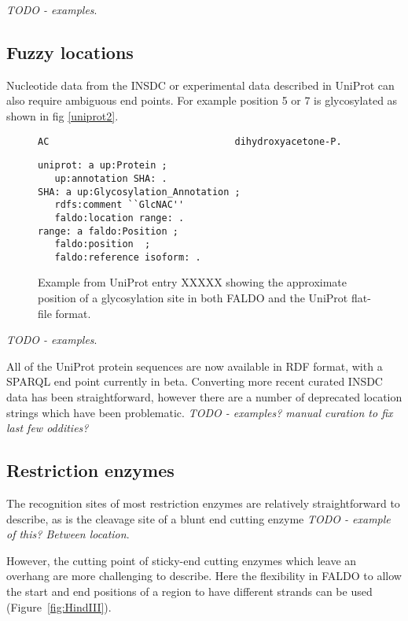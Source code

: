\textit{TODO - examples}.

\subsection*{Fuzzy locations}
Nucleotide data from the INSDC or experimental data described in UniProt 
can also require ambiguous end points. For example position 5 or 7 is glycosylated
as shown in fig \ref{uniprot2}.

\begin{figure}
\begin{verbatim}
AC                                 dihydroxyacetone-P.
\end{verbatim}
\begin{verbatim}
uniprot: a up:Protein ;
   up:annotation SHA: .
SHA: a up:Glycosylation_Annotation ;
   rdfs:comment ``GlcNAC''
   faldo:location range: .
range: a faldo:Position ;
   faldo:position  ;
   faldo:reference isoform: .
\end{verbatim}
\caption{Example from UniProt entry XXXXX showing the approximate position of a glycosylation site in both FALDO and the UniProt flat-file format.}
\label{fig:UniProt}
\end{figure}

\textit{TODO - examples}.

All of the UniProt protein sequences are now available in RDF format,
with a SPARQL end point currently in beta. Converting more recent
curated INSDC data has been straightforward, however there are a
number of deprecated location strings which have been problematic.
\textit{TODO - examples? manual curation to fix last few oddities?}

\subsection*{Restriction enzymes}

The recognition sites of most restriction enzymes are relatively
straightforward to describe, as is the cleavage site of a blunt
end cutting enzyme \textit{TODO - example of this? Between location}.

However, the cutting point of sticky-end cutting enzymes which
leave an overhang are more challenging to describe. Here the
flexibility in FALDO to allow the start and end positions of a region
to have different strands can be used (Figure~\ref{fig:HindIII}).

